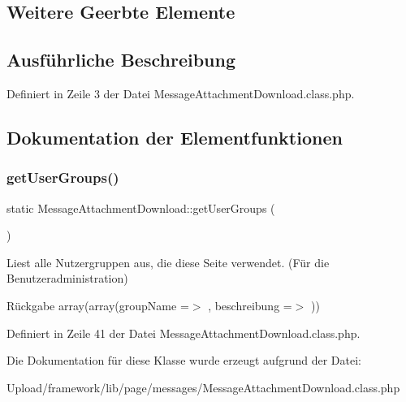 \subsection*{Weitere Geerbte Elemente}


\subsection{Ausführliche Beschreibung}


Definiert in Zeile 3 der Datei Message\+Attachment\+Download.\+class.\+php.



\subsection{Dokumentation der Elementfunktionen}
\mbox{\label{class_message_attachment_download_a62dcc05ff5fbb75b7fa4ed677fc62b6b}} 
\subsubsection{\texorpdfstring{get\+User\+Groups()}{getUserGroups()}}
{\footnotesize\ttfamily static Message\+Attachment\+Download\+::get\+User\+Groups (\begin{DoxyParamCaption}{ }\end{DoxyParamCaption})\hspace{0.3cm}{\ttfamily [static]}}

Liest alle Nutzergruppen aus, die diese Seite verwendet. (Für die Benutzeradministration) \begin{DoxyReturn}{Rückgabe}
array(array(\textquotesingle{}group\+Name\textquotesingle{} =$>$ \textquotesingle{}\textquotesingle{}, \textquotesingle{}beschreibung\textquotesingle{} =$>$ \textquotesingle{}\textquotesingle{})) 
\end{DoxyReturn}


Definiert in Zeile 41 der Datei Message\+Attachment\+Download.\+class.\+php.



Die Dokumentation für diese Klasse wurde erzeugt aufgrund der Datei\+:\begin{DoxyCompactItemize}
\item 
Upload/framework/lib/page/messages/Message\+Attachment\+Download.\+class.\+php\end{DoxyCompactItemize}
